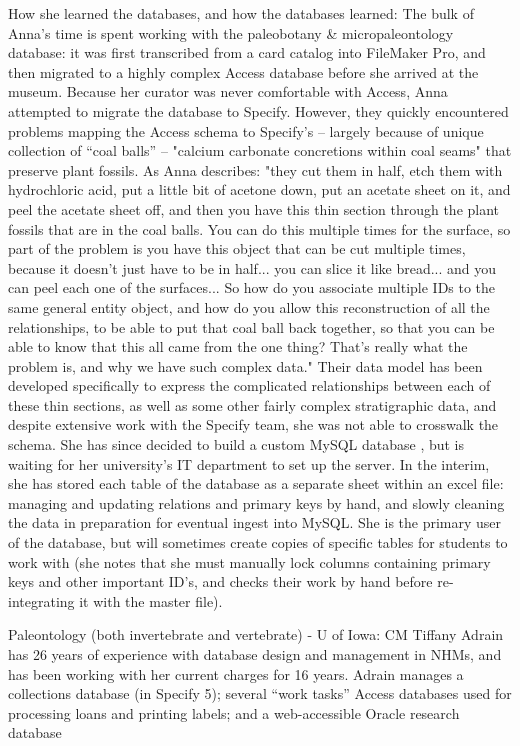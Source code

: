 How she learned the databases, and how the databases learned:  The bulk of Anna’s time is spent working with the paleobotany & micropaleontology database: it was first transcribed from a card catalog into FileMaker Pro, and then migrated to a highly complex Access database before she arrived at the museum.  Because her curator was never comfortable with Access, Anna attempted to migrate the database to Specify. However, they quickly encountered problems mapping the Access schema to Specify’s – largely because of unique collection of “coal balls” -- "calcium carbonate concretions within coal seams" that preserve plant fossils.  As Anna describes:
"they cut them in half, etch them with hydrochloric acid, put a little bit of acetone down, put an acetate sheet on it, and peel the acetate sheet off, and then you have this thin section through the plant fossils that are in the coal balls.  You can do this multiple times for the surface, so part of the problem is you have this object that can be cut multiple times, because it doesn't just have to be in half... you can slice it like bread... and you can peel each one of the surfaces...  So how do you associate multiple IDs to the same general entity object, and how do you allow this reconstruction of all the relationships, to be able to put that coal ball back together, so that you can be able to know that this all came from the one thing?  That's really what the problem is, and why we have such complex data."
Their data model has been developed specifically to express the complicated relationships between each of these thin sections, as well as some other fairly complex stratigraphic data, and despite extensive work with the Specify team, she was not able to crosswalk the schema.  She has since decided to build a custom MySQL database , but is waiting for her university’s IT department to set up the server.  In the interim, she has stored each table of the database as a separate sheet within an excel file: managing and updating relations and primary keys by hand, and slowly cleaning the data in preparation for eventual ingest into MySQL. She is the primary user of the database, but will sometimes create copies of specific tables for students to work with (she notes that she must manually lock columns containing primary keys and other important ID’s, and checks their work by hand before re-integrating it with the master file).

Paleontology (both invertebrate and vertebrate) - U of Iowa:  CM Tiffany Adrain has 26 years of experience with database design and management in NHMs, and has been working with her current charges for 16 years.  Adrain manages a collections database (in Specify 5); several “work tasks” Access databases used for processing loans and printing labels; and a web-accessible Oracle research database 


